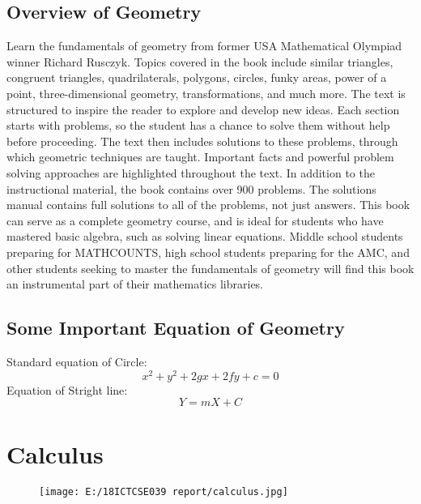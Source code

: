 \documentclass{article}
\begin{document}
\subsection{Overview of Geometry}
Learn the fundamentals of geometry from former USA Mathematical Olympiad winner Richard Rusczyk. Topics covered in the book include similar triangles, congruent triangles, quadrilaterals, polygons, circles, funky areas, power of a point, three-dimensional geometry, transformations, and much more.
\newline \newline
The text is structured to inspire the reader to explore and develop new ideas. Each section starts with problems, so the student has a chance to solve them without help before proceeding. The text then includes solutions to these problems, through which geometric techniques are taught. Important facts and powerful problem solving approaches are highlighted throughout the text. In addition to the instructional material, the book contains over 900 problems. The solutions manual contains full solutions to all of the problems, not just answers.
\newline \newline
This book can serve as a complete geometry course, and is ideal for students who have mastered basic algebra, such as solving linear equations. Middle school students preparing for MATHCOUNTS, high school students preparing for the AMC, and other students seeking to master the fundamentals of geometry will find this book an instrumental part of their mathematics libraries.
\subsection{Some Important Equation of Geometry}
Standard equation of Circle:
$$x^2+y^2+2gx+2fy+c=0$$
Equation of Stright line:
$$Y=mX+C$$
\newpage


\section{Calculus}
\begin{figure}[H]
\texttt{[image: E:/18ICTCSE039 report/calculus.jpg]}
\end{figure}
\end{document}
